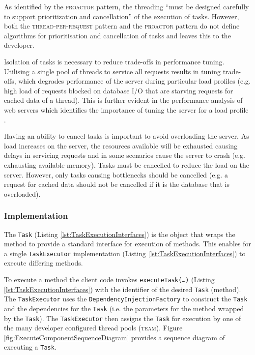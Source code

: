 \documentclass[prodmode]{style/acmlarge}
\begin{document}
As identified by the \textsc{proactor} pattern, the threading ``must be designed
carefully to support prioritization and cancellation'' \cite[p. 8]{proactor} of
the execution of tasks.  However, both the \textsc{thread-per-request} pattern and
the \textsc{proactor} pattern do not define algorithms for
prioritisation and cancellation of tasks and leaves this to the developer.

Isolation of tasks is necessary to reduce trade-offs in performance tuning. 
Utilising a single pool of threads to service all requests results in tuning
trade-offs, which degrades performance of the server during particular load
profiles (e.g. high load of requests blocked on database I/O that are starving
requests for cached data of a thread).  This is further evident in the
performance analysis of web servers which identifies the importance of tuning
the server for a load profile
\cite{tuning-important,low-server-footprint,tuning-os-important}.

Having an ability to cancel tasks is important to avoid overloading the server.
As load increases on the server, the resources available will be exhausted
causing delays in servicing requests and in some scenarios cause the server to
crash (e.g. exhausting available memory).  Tasks must be cancelled to reduce the
load on the server.  However, only tasks causing bottlenecks should be cancelled
(e.g. a request for cached data should not be cancelled if it is the database
that is overloaded).


\subsubsection*{Implementation}

The \texttt{Task} (Listing \ref{lst:TaskExecutionInterfaces}) is the object that wraps
the method to provide a standard interface for execution of methods.  This
enables for a single \texttt{TaskExecutor} implementation (Listing
\ref{lst:TaskExecutionInterfaces}) to execute differing methods.

To execute a method the client code invokes \texttt{executeTask(\ldots)}
(Listing \ref{lst:TaskExecutionInterfaces}) with the identifier of the desired
\texttt{Task} (method).  The \texttt{TaskExecutor} uses the
\texttt{DependencyInjectionFactory} to construct the \texttt{Task}
and the dependencies for the \texttt{Task} (i.e. the parameters for the method
wrapped by the \texttt{Task}).  The \texttt{TaskExecutor} then assigns the
\texttt{Task} for execution by one of the many developer configured thread pools
(\textsc{team}).  Figure \ref{fig:ExecuteComponentSequenceDiagram} provides a
sequence diagram of executing a \texttt{Task}.
\end{document}
